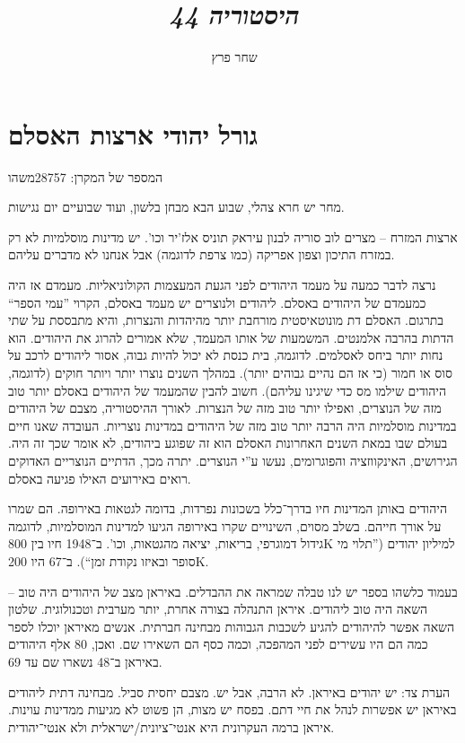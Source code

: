 \documentclass[]{../../../../tex/classes/styledArticle}
\author{שחר פרץ}
\title{\textit{היסטוריה 44}}
\begin{document}
	\maketitle
	\section*{גורל יהודי ארצות האסלם}
	
	המספר של המקרן: 28757משהו
	
	מחר יש חרא צהלי, שבוע הבא מבחן בלשון, ועוד שבועיים יום נגישות. 
	
	ארצות המזרח – מצרים לוב סוריה לבנון עיראק תוניס אלז'יר וכו'. יש מדינות מוסלמיות לא רק במזרח התיכון וצפון אפריקה (כמו צרפת לדוגמה) אבל אנחנו לא מדברים עליהם. 
	
	נרצה לדבר כמעה על מעמד היהודים לפני הגעת המעצמות הקולוניאליות. מעמדם אז היה כמעמדם של היהודים באסלם. ליהודים ולנוצרים יש מעמד באסלם, הקרוי ''עמי הספר`` בתרגום. האסלם דת מונוטאיסטית מורחבת יותר מהיהדות והנצרות, והיא מתבססת על שתי הדתות בהרבה אלמנטים. המשמעות של אותו המעמד, שלא אמורים להרוג את היהודים. הוא נחות יותר ביחס לאסלמים. לדוגמה, בית כנסת לא יכול להיות גבוה, אסור ליהודים לרכב על סוס או חמור (כי אז הם נהיים גבוהים יותר). במהלך השנים נוצרו יותר ויותר חוקים (לדוגמה, היהודים שילמו מס כדי שיגינו עליהם). חשוב להבין שהמעמד של היהודים באסלם יותר טוב מזה של הנוצרים, ואפילו יותר טוב מזה של הנצרות. לאורך ההיסטוריה, מצבם של היהודים במדינות מוסלמיות היה הרבה יותר טוב מזה של היהודים במדינות נוצריות. העובדה שאנו חיים בעולם שבו במאת השנים האחרונות האסלם הוא זה שפוגע ביהודים, לא אומר שכך זה היה. הגירושים, האינקווזציה והפוגרומים, נעשו ע''י הנוצרים. יתרה מכך, הדתיים הנוצריים האדוקים רואים באירועים האילו פגיעה באסלם. 
	
	היהודים באותן המדינות חיו בדרך־כלל בשכונות נפרדות, בדומה לגטאות באירופה. הם שמרו על אורך חייהם. בשלב מסוים, השינויים שקרו באירופה הגיעו למדינות המוסלמיות, לדוגמה גידול דמוגרפי, בריאות, יציאה מהגטאות, וכו'. ב־1948 חיו בין 800K למיליון יהודים (''תלוי מי סופר ובאיזו נקודת זמן``). ב־67 היו 200K. 
	
	בעמוד כלשהו בספר יש לנו טבלה שמראה את ההבדלים. באיראן מצב של היהודים היה טוב – השאה היה טוב ליהודים. איראן התנהלה בצורה אחרת, יותר מערבית וטכנולוגית. שלטון השאה אפשר להיהודים להגיע לשכבות הגבוהות מבחינה חברתית. אנשים מאיראן יוכלו לספר כמה הם היו עשירים לפני המהפכה, וכמה כסף הם השאירו שם. ואכן, 80 אלף היהודים באיראן ב־48 נשארו שם עד 69. 
	
	הערת צד: יש יהודים באיראן. לא הרבה, אבל יש. מצבם יחסית סביל. מבחינה דתית ליהודים באיראן יש אפשרות לנהל את חיי דתם. בפסח יש מצות, הן פשוט לא מגיעות ממדינות עוינות. איראן ברמה העקרונית היא אנטי־ציונית/ישראלית ולא אנטי־יהודית. 
	
\end{document}
